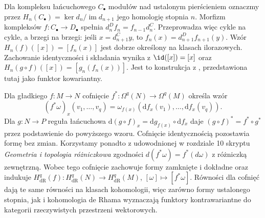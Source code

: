 \begin{przyklad}\label{cat:ex:homology-functor}
Dla kompleksu łańcuchowego $C_\bullet$ modułów nad ustalonym pierścieniem oznaczmy przez $H_n(C_\bullet)=\ker d_n/\operatorname{im}d_{n+1}$ jego homologię stopnia $n$. Morfizm kompleksów $f:C_\bullet\to D_\bullet$ spełnia $d_n^D f_n=f_{n-1}d_n^C$. Przeprowadza więc cykle na cykle, a brzegi na brzegi: jeśli $x=d_{n+1}^C y$, to $f_n(x)=d_{n+1}^D f_{n+1}(y)$. Wzór $H_n(f)([x])=[f_n(x)]$ jest dobrze określony na klasach ilorazowych. Zachowanie identyczności i składania wynika z $\id([x])=[x]$ oraz $H_n(g\circ f)([x])=[g_n(f_n(x))]$. Jest to konstrukcja z , przedstawiona tutaj jako funktor kowariantny.
\end{przyklad}

\begin{przyklad}\label{cat:ex:derham-functor}
Dla gładkiego $f:M\to N$ cofnięcie $f^*:\Omega^q(N)\to\Omega^q(M)$ określa wzór
\[
(f^*\omega)_x(v_1,\ldots,v_q)=
\omega_{f(x)}(\mathrm df_x(v_1),\ldots,\mathrm df_x(v_q)).
\]
Dla $g:N\to P$ reguła łańcuchowa $\mathrm d(g\circ f)_x=\mathrm dg_{f(x)}\circ\mathrm df_x$ daje $(g\circ f)^*=f^*\circ g^*$ przez podstawienie do powyższego wzoru. Cofnięcie identycznością pozostawia formę bez zmian. Korzystamy ponadto z udowodnionej w rozdziale 10 skryptu \emph{Geometria i topologia różniczkowa} zgodności $d(f^*\omega)=f^*(d\omega)$ z różniczką zewnętrzną. Wobec tego cofnięcie zachowuje formy zamknięte i dokładne oraz indukuje $H^q_{\mathrm{dR}}(f):H^q_{\mathrm{dR}}(N)\to H^q_{\mathrm{dR}}(M)$, $[\omega]\mapsto[f^*\omega]$. Równości dla cofnięć dają te same równości na klasach kohomologii, więc zarówno formy ustalonego stopnia, jak i kohomologia de Rhama wyznaczają funktory kontrawariantne do kategorii rzeczywistych przestrzeni wektorowych.
\end{przyklad}

